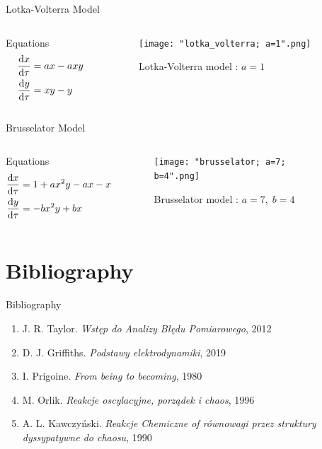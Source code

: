 \documentclass[xcolor]{beamer}
\begin{document}
\begin{frame}{Lotka-Volterra Model}
\begin{columns}
\begin{column}{0.4\textwidth}
\begin{block}{Equations}
\begin{align*}
\odv{x}{\tau} &= ax - axy \\
\odv{y}{\tau} &= xy - y
\end{align*}
\end{block}
\end{column}

\begin{column}{0.6\textwidth}
\begin{figure}[H]
\centering
\texttt{[image: "lotka\_volterra; a=1".png]}
\caption{Lotka-Volterra model  : \(a=1\)}
\end{figure}
\end{column}
\end{columns}
\end{frame}

\begin{frame}{Brusselator Model}
\begin{columns}
\begin{column}{0.4\textwidth}
\begin{block}{Equations}
\begin{align*}
\odv{x}{\tau} &= 1 + ax^{2}y - ax - x \\
\odv{y}{\tau} &= -bx^{2}y + bx
\end{align*}
\end{block}
\end{column}

\begin{column}{0.6\textwidth}
\begin{figure}[H]
\centering
\texttt{[image: "brusselator; a=7; b=4".png]}
\caption{Brusselator model  : \(a=7, \; b=4\)}
\end{figure}
\end{column}
\end{columns}
\end{frame}

\section{Bibliography}
\begin{frame}{Bibliography}
\begin{enumerate}
\item J. R. Taylor. \emph{Wstęp do Analizy Błędu Pomiarowego}, 2012
\item D. J. Griffiths. \emph{Podstawy elektrodynamiki}, 2019
\item I. Prigoine. \emph{From being to becoming}, 1980
\item M. Orlik. \emph{Reakcje oscylacyjne, porządek i chaos}, 1996
\item A. L. Kawczyński. \emph{Reakcje Chemiczne of równowagi przez struktury dyssypatywne do chaosu}, 1990
\end{enumerate}
\end{frame}
\end{document}
